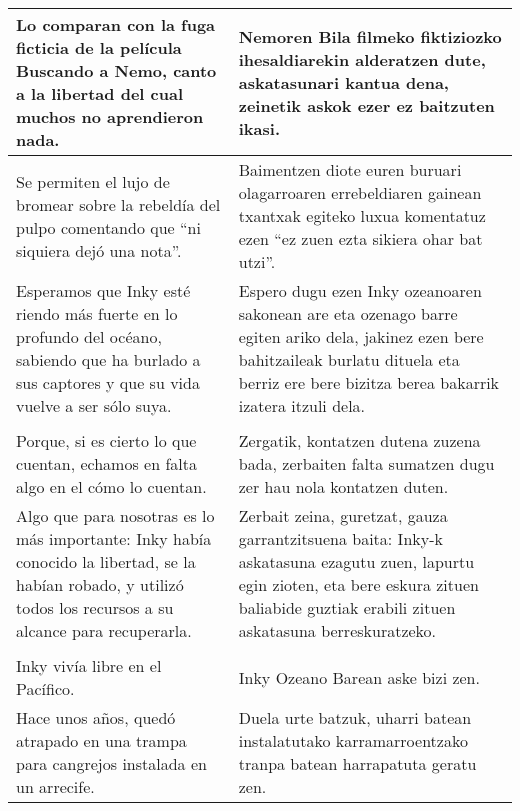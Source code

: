 \documentclass{article}
\begin{document}
\begin{center}
\begin{longtable}{|p{6cm}|p{6cm}|}
  \midrule
  Lo comparan con la fuga ficticia de la película Buscando a Nemo, canto a la libertad del cual muchos no aprendieron nada.&
  Nemoren Bila filmeko fiktiziozko ihesaldiarekin alderatzen dute, askatasunari kantua dena, zeinetik askok ezer ez baitzuten ikasi.\\

  \midrule
  Se permiten el lujo de bromear sobre la rebeldía del pulpo comentando que ``ni siquiera dejó una nota''.&
  Baimentzen diote euren buruari olagarroaren errebeldiaren gainean txantxak egiteko luxua komentatuz ezen ``ez zuen ezta sikiera ohar bat utzi''.\\

  \midrule
  Esperamos que Inky esté riendo más fuerte en lo profundo del océano, sabiendo que ha burlado a sus captores y que su vida vuelve a ser sólo suya.&
  Espero dugu ezen Inky ozeanoaren sakonean are eta ozenago barre egiten ariko dela, jakinez ezen bere bahitzaileak burlatu dituela eta berriz ere bere bizitza berea bakarrik izatera itzuli dela.\\

  \midrule
  \cellcolor{lightgray}{\textbf{Párrafo}} &
  \cellcolor{lightgray}{\textbf{Paragrafoa}}\\
  
  \midrule
  Porque, si es cierto lo que cuentan, echamos en falta algo en el cómo lo cuentan.&
  Zergatik, kontatzen dutena zuzena bada, zerbaiten falta sumatzen dugu zer hau nola kontatzen duten.\\

  \midrule
  Algo que para nosotras es lo más importante: Inky había conocido la libertad, se la habían robado, y utilizó todos los recursos a su alcance para recuperarla.&
  Zerbait zeina, guretzat, gauza garrantzitsuena baita: Inky-k askatasuna ezagutu zuen, lapurtu egin zioten, eta bere eskura zituen baliabide guztiak erabili zituen askatasuna berreskuratzeko.\\

  \midrule
  \cellcolor{lightgray}{\textbf{Párrafo}} &
  \cellcolor{lightgray}{\textbf{Paragrafoa}}\\
  
  \midrule
  Inky vivía libre en el Pacífico.&
  Inky Ozeano Barean aske bizi zen.\\

  \midrule
  Hace unos años, quedó atrapado en una trampa para cangrejos instalada en un arrecife.&
  Duela urte batzuk, uharri batean instalatutako karramarroentzako tranpa batean harrapatuta geratu zen.\\


\end{longtable}
\end{center}
\end{document}
